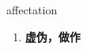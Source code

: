 
\begin{frame}
{\huge affectation}
\begin{center}
\begin{enumerate}\Large
  \item \textbf{虚伪，做作}
\end{enumerate}
\end{center}
\end{frame}
